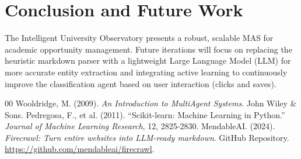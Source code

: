 \documentclass[conference]{IEEEtran}
\begin{document}
\section{Conclusion and Future Work}
The Intelligent University Observatory presents a robust, scalable MAS for academic opportunity management. Future iterations will focus on replacing the heuristic markdown parser with a lightweight Large Language Model (LLM) for more accurate entity extraction and integrating active learning to continuously improve the classification agent based on user interaction (clicks and saves).

\begin{thebibliography}{00}
 Wooldridge, M. (2009). \textit{An Introduction to MultiAgent Systems}. John Wiley \& Sons.
 Pedregosa, F., et al. (2011). ``Scikit-learn: Machine Learning in Python.'' \textit{Journal of Machine Learning Research}, 12, 2825-2830.
 MendableAI. (2024). \textit{Firecrawl: Turn entire websites into LLM-ready markdown}. GitHub Repository. \url{https://github.com/mendableai/firecrawl}.
\end{thebibliography}
\end{document}
